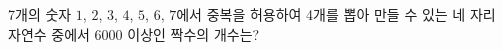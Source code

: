 7개의 숫자 $1$, $2$, $3$, $4$, $5$, $6$, $7$에서 중복을 허용하여 4개를 뽑아 만들 수 있는 네 자리 자연수 중에서 $6000$ 이상인 짝수의 개수는?
